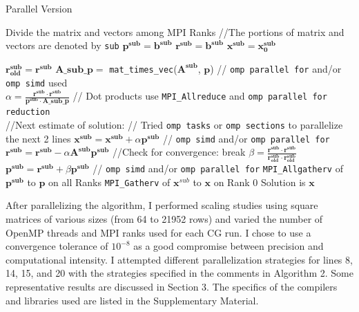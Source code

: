 \documentclass{article}
\begin{document}
\begin{algorithm}
	\begin{algorithmic}[1]
		\caption{Parallel Version}
		\State Divide the matrix and vectors among MPI Ranks
		\State //The portions of matrix and vectors are denoted by \texttt{sub}
		\State $\mathbf{p^{sub}} = \mathbf{b^{sub}}$
		\State $\mathbf{r^{sub}} = \mathbf{b^{sub}}$
		\State $\mathbf{x^{sub}} = \mathbf{x^{sub}_0}$
		
		\State $\mathbf{r^{sub}_{old}} = \mathbf{r^{sub}}$
		\State $\mathbf{A\_sub\_p} =$ \texttt{mat\_times\_vec}($\mathbf{A^{sub}}$, $\mathbf{p}$)  // \texttt{omp parallel for} and/or \texttt{omp simd} used \\
		\State $\alpha = \frac{\mathbf{r^{sub}} \cdot \mathbf{r^{sub}}}{\mathbf{p^{sub}} \cdot \mathbf{A\_sub\_p} }$  // Dot products use \texttt{MPI\_Allreduce} and \texttt{omp parallel for reduction} \\
		\State //Next estimate of solution:
		\State // Tried \texttt{omp tasks} or \texttt{omp sections} to parallelize the next 2 lines
		\State $\mathbf{x^{sub}} = \mathbf{x^{sub}} + \alpha \mathbf{p^{sub}}$ // \texttt{omp simd} and/or \texttt{omp parallel for}
		\State $\mathbf{r^{sub}} = \mathbf{r^{sub}} - \alpha \mathbf{A^{sub}p^{sub}}$
		\State //Check for convergence:
		\State break
		\EndIf
		\State $\beta = \frac{\mathbf{r^{sub}} \cdot \mathbf{r^{sub}}}{\mathbf{r^{sub}_{old}} \cdot \mathbf{r^{sub}_{old}}}$
		\State $\mathbf{p^{sub}} = \mathbf{r^{sub}} + \beta \mathbf{p^{sub}}$ // \texttt{omp simd} and/or \texttt{omp parallel for}
		\State \texttt{MPI\_Allgatherv} of $\mathbf{p^{sub}}$ to $\mathbf{p}$ on all Ranks
		\EndFor
		\State \texttt{MPI\_Gatherv} of $\mathbf{x}^{sub}$ to $\mathbf{x}$ on Rank 0
		\State Solution is $\mathbf{x}$
	\end{algorithmic}
\end{algorithm}

After parallelizing the algorithm, I performed scaling studies using square matrices of various sizes (from 64 to 21952 rows) and varied the number of OpenMP threads and MPI ranks used for each CG run. I chose to use a convergence tolerance of $10^{-8}$ as a good compromise between precision and computational intensity. I attempted different parallelization strategies for lines 8, 14, 15, and 20 with the strategies specified in the comments in Algorithm 2. Some representative results are discussed in Section 3. The specifics of the compilers and libraries used are listed in the Supplementary Material.
\end{document}
